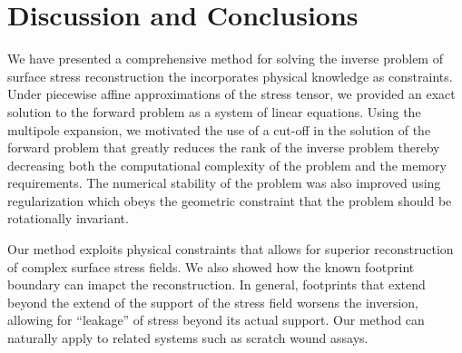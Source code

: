 \documentclass[aps,prl,reprint,twocolumn,groupedaddress,showpacs]{revtex4-1}
\begin{document}
\section{Discussion and Conclusions}

We have presented a comprehensive method for solving the inverse
problem of surface stress reconstruction the incorporates physical
knowledge as constraints.  Under piecewise affine approximations of
the stress tensor, we provided an exact solution to the forward
problem as a system of linear equations. Using the multipole
expansion, we motivated the use of a cut-off in the solution of the
forward problem that greatly reduces the rank of the inverse problem
thereby decreasing both the computational complexity of the problem
and the memory requirements. The numerical stability of the problem
was also improved using regularization which obeys the geometric 
constraint that the problem should be rotationally invariant.

Our method exploits physical constraints that allows for superior
reconstruction of complex surface stress fields.  We also showed how
the known footprint boundary can imapct the reconstruction. In
general, footprints that extend beyond the extend of the support of
the stress field worsens the inversion, allowing for ``leakage'' of
stress beyond its actual support. Our method can naturally apply to
related systems such as scratch wound assays. 



\appendix
\end{document}
